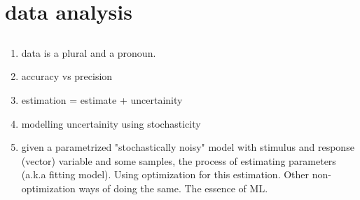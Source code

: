 \documentclass[../main.tex]{subfiles}
\begin{document}
\chapter{data analysis}

\section{}
\todo
\begin{enumerate}[nolistsep]
  \item data is a plural and a pronoun.
  \item accuracy vs precision
  \item estimation = estimate + uncertainity
  \item modelling uncertainity using stochasticity
  \item given a parametrized "stochastically noisy" model with stimulus and response (vector) variable and some samples, the process of estimating parameters (a.k.a fitting model). Using optimization for this estimation. Other non-optimization ways of doing the same. The essence of ML.
\end{enumerate}
\end{document}
